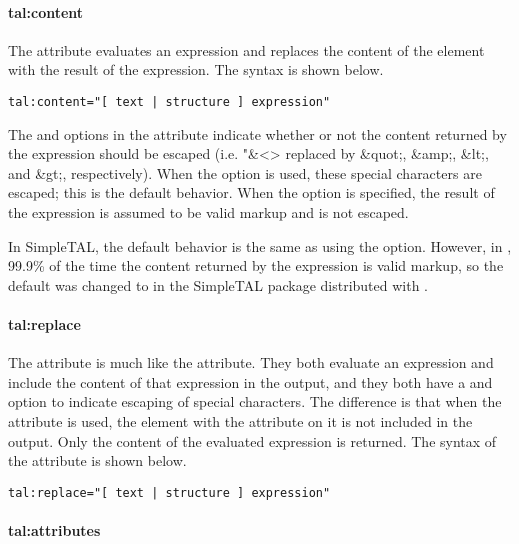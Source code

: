 \paragraph{tal:content}

The  attribute evaluates an expression and replaces
the content of the element with the result of the expression.  The
syntax is shown below.
\begin{verbatim}
tal:content="[ text | structure ] expression"
\end{verbatim}

The  and  options in the 
attribute indicate whether or not the content returned by the
expression should be escaped (i.e. "\&<> replaced by \&quot;, \&amp;, \&lt;,
and \&gt;, respectively).  When the  option is used, these
special characters are escaped; this is the default behavior.  When
the  option is specified, the result of the expression is
assumed to be valid markup and is not escaped.

In SimpleTAL, the default
behavior is the same as using the  option.  However, in
\plasTeX, 99.9\% of the time the content returned by the expression is
valid markup, so the default was changed to  in the
SimpleTAL package distributed with \plasTeX.


\paragraph{tal:replace}

The  attribute is much like the 
attribute.  They both evaluate an expression and include the content
of that expression in the output, and they both have a  and
 option to indicate escaping of special characters.
The difference is that when the  attribute is used,
the element with the  attribute on it is not included
in the output.  Only the content of the evaluated expression is returned.
The syntax of the  attribute is shown below.
\begin{verbatim}
tal:replace="[ text | structure ] expression"
\end{verbatim}


\paragraph{tal:attributes}

